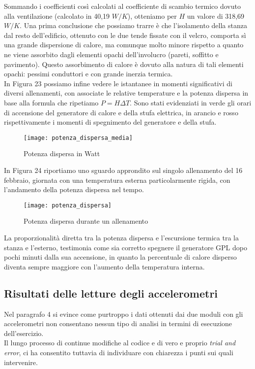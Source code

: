 \documentclass[fleqn,10pt]{SelfArx} %
\begin{document}
Sommando i coefficienti così calcolati al coefficiente di scambio termico dovuto alla ventilazione (calcolato in 40,19 $ W/K $), 
otteniamo per $ H $ un valore di 318,69 $ W/K $.
Una prima conclusione che possiamo trarre è che l'isolamento della stanza dal resto dell'edificio, ottenuto con le due tende 
fissate con il velcro, comporta sì una grande dispersione di calore, ma comunque molto minore rispetto a quanto ne viene 
assorbito dagli elementi opachi dell'involucro (pareti, soffitto e pavimento). Questo assorbimento di calore è dovuto alla natura 
di tali elementi opachi: pessimi conduttori e con grande inerzia termica.\\

In Figura 23 possiamo infine vedere le istantanee in momenti significativi di diversi allenamenti, con associate le relative 
temperature e la potenza dispersa in base alla formula che ripetiamo $ P = H \Delta T $. Sono stati evidenziati in verde gli orari 
di accensione del generatore di calore e della stufa elettrica, in arancio e rosso rispettivamente i momenti di spegnimento del 
generatore e della stufa.

\begin{figure}[htb]\centering
	\texttt{[image: potenza\_dispersa\_media]}
	\caption{Potenza dispersa in Watt}
	\label{fig:potenza media dispersa}
\end{figure}

In Figura 24 riportiamo uno sguardo approndito sul singolo allenamento del 16 febbraio, giornata con una temperatura esterna 
particolarmente rigida, con l'andamento della potenza dispersa nel tempo.

\begin{figure}[htb]\centering
	\texttt{[image: potenza\_dispersa]}
	\caption{Potenza dispersa durante un allenamento}
	\label{fig:potenza dispersa allenamento}
\end{figure}

La proporzionalità diretta tra la potenza dispersa e l'escursione termica tra la stanza e l'esterno, testimonia come sia 
corretto spegnere il generatore GPL dopo pochi minuti dalla sua accensione, in quanto la percentuale di calore disperso diventa 
sempre maggiore con l'aumento della temperatura interna.

\subsection{Risultati delle letture degli accelerometri}
Nel paragrafo 4 si evince come purtroppo i dati ottenuti dai due moduli con gli accelerometri non consentano nessun tipo di 
analisi in termini di esecuzione dell'esercizio.\\
Il lungo processo di continue modifiche al codice e di vero e proprio \textit{trial and error}, ci ha consentito tuttavia 
di individuare con chiarezza i punti sui quali intervenire.\\
\end{document}
